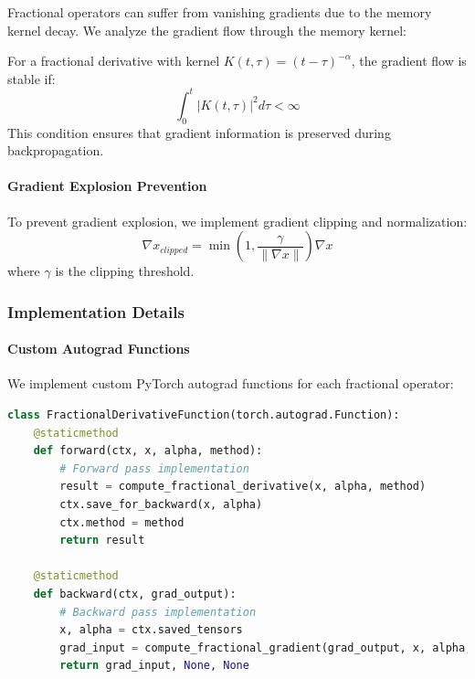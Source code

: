 Fractional operators can suffer from vanishing gradients due to the memory kernel decay. We analyze the gradient flow through the memory kernel:

\begin{theorem}
For a fractional derivative with kernel $K(t,\tau) = (t-\tau)^{-\alpha}$, the gradient flow is stable if:
\begin{equation}
\int_0^t |K(t,\tau)|^2 d\tau < \infty
\end{equation}
This condition ensures that gradient information is preserved during backpropagation.
\end{theorem}

\paragraph{Gradient Explosion Prevention}

To prevent gradient explosion, we implement gradient clipping and normalization:
\begin{equation}
\nabla x_{clipped} = \min\left(1, \frac{\gamma}{\|\nabla x\|}\right) \nabla x
\end{equation}
where $\gamma$ is the clipping threshold.

\subsubsection{Implementation Details}

\paragraph{Custom Autograd Functions}

We implement custom PyTorch autograd functions for each fractional operator:

\begin{lstlisting}[language=Python, caption=Fractional Autograd Implementation]
class FractionalDerivativeFunction(torch.autograd.Function):
    @staticmethod
    def forward(ctx, x, alpha, method):
        # Forward pass implementation
        result = compute_fractional_derivative(x, alpha, method)
        ctx.save_for_backward(x, alpha)
        ctx.method = method
        return result
    
    @staticmethod
    def backward(ctx, grad_output):
        # Backward pass implementation
        x, alpha = ctx.saved_tensors
        grad_input = compute_fractional_gradient(grad_output, x, alpha, ctx.method)
        return grad_input, None, None
\end{lstlisting}

